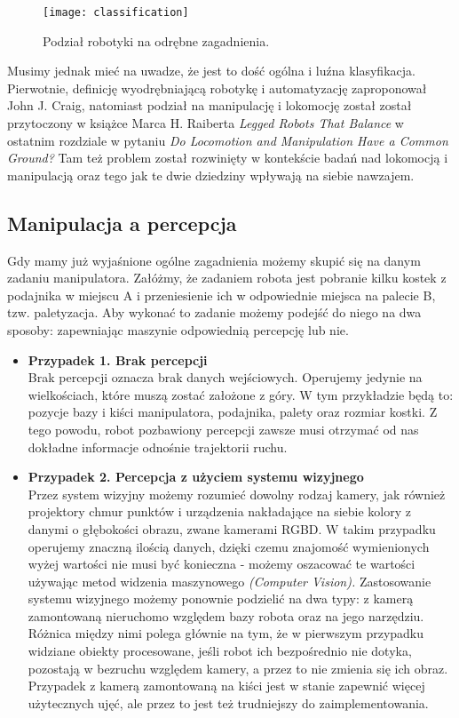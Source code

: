 \documentclass{article}
\begin{document}
\begin{figure}[h]
\centering
\texttt{[image: classification]}
\caption{Podział robotyki na odrębne zagadnienia.}
\end{figure}

Musimy jednak mieć na uwadze, że jest to dość ogólna i luźna klasyfikacja. Pierwotnie, definicję wyodrębniającą robotykę i automatyzację zaproponował John J. Craig, natomiast podział na manipulację i lokomocję został został przytoczony w książce Marca H. Raiberta \emph{Legged Robots That Balance} w ostatnim rozdziale w pytaniu \emph{Do Locomotion and Manipulation Have a Common Ground?} Tam też problem został rozwinięty w kontekście badań nad lokomocją i manipulacją oraz tego jak te dwie dziedziny wpływają na siebie nawzajem.

\subsection{\LARGE{Manipulacja a percepcja}}
Gdy mamy już wyjaśnione ogólne zagadnienia możemy skupić się na danym zadaniu manipulatora. Załóżmy, że zadaniem robota jest pobranie kilku kostek z podajnika w miejscu A i przeniesienie ich w odpowiednie miejsca na palecie B, tzw. paletyzacja. Aby wykonać to zadanie możemy podejść do niego na dwa sposoby: zapewniając maszynie odpowiednią percepcję lub nie. 

\begin{itemize}
\item \textbf{Przypadek 1. Brak percepcji} \\
Brak percepcji oznacza brak danych wejściowych. Operujemy jedynie na wielkościach, które muszą zostać założone z góry. W tym przykładzie będą to: pozycje bazy i kiści manipulatora, podajnika, palety oraz rozmiar kostki. Z tego powodu, robot pozbawiony percepcji zawsze musi otrzymać od nas dokładne informacje odnośnie trajektorii ruchu.

\item \textbf{Przypadek 2. Percepcja z użyciem systemu wizyjnego} \\
Przez system wizyjny możemy rozumieć dowolny rodzaj kamery, jak również projektory chmur punktów i urządzenia nakładające na siebie kolory z danymi o głębokości obrazu, zwane kamerami RGBD. W takim przypadku operujemy znaczną ilością danych, dzięki czemu znajomość wymienionych wyżej wartości nie musi być konieczna - możemy oszacować te wartości używając metod widzenia maszynowego \emph{(Computer Vision).} Zastosowanie systemu wizyjnego możemy ponownie podzielić na dwa typy: z kamerą zamontowaną nieruchomo względem bazy robota oraz na jego narzędziu. Różnica między nimi polega głównie na tym, że w pierwszym przypadku widziane obiekty procesowane, jeśli robot ich bezpośrednio nie dotyka, pozostają w bezruchu względem kamery, a przez to nie zmienia się ich obraz. Przypadek z kamerą zamontowaną na kiści jest w stanie zapewnić więcej użytecznych ujęć, ale przez to jest też trudniejszy do zaimplementowania.
\end{itemize}
\end{document}
